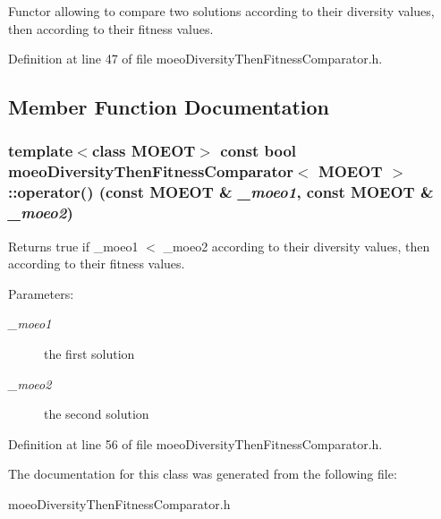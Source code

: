 Functor allowing to compare two solutions according to their diversity values, then according to their fitness values. 



Definition at line 47 of file moeo\-Diversity\-Then\-Fitness\-Comparator.h.

\subsection{Member Function Documentation}
\subsubsection{\setlength{\rightskip}{0pt plus 5cm}template$<$class MOEOT$>$ const bool \bf{moeo\-Diversity\-Then\-Fitness\-Comparator}$<$ MOEOT $>$::operator() (const MOEOT \& {\em \_\-moeo1}, const MOEOT \& {\em \_\-moeo2})\hspace{0.3cm}{\tt  [inline]}}\label{classmoeoDiversityThenFitnessComparator_62620887203d033af92091d838d4b0b6}


Returns true if \_\-moeo1 $<$ \_\-moeo2 according to their diversity values, then according to their fitness values. 

\begin{Desc}
\item[Parameters:]
\begin{description}
\item[{\em \_\-moeo1}]the first solution \item[{\em \_\-moeo2}]the second solution \end{description}
\end{Desc}


Definition at line 56 of file moeo\-Diversity\-Then\-Fitness\-Comparator.h.

The documentation for this class was generated from the following file:\begin{CompactItemize}
\item 
moeo\-Diversity\-Then\-Fitness\-Comparator.h\end{CompactItemize}
